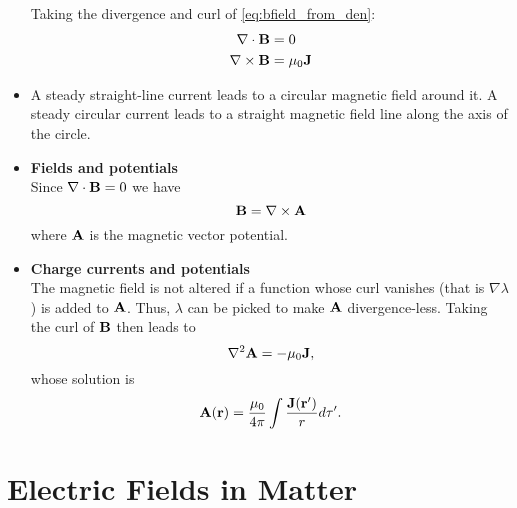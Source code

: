 \documentclass[11pt]{article}
\begin{document}
\begin{itemize}
Taking the divergence and curl of \cref{eq:bfield_from_den}:
\begin{align}
\nabla \cdot \mathbf{B} &= 0 \\
\nabla \times \mathbf{B} &= \mu_0 \mathbf{J} \label{eq:amperes_law}
\end{align}


\item A steady straight-line current leads to a circular magnetic field around it. A steady circular current leads to a straight magnetic field line along the axis of the circle.

\item \textbf{Fields and potentials} \\
Since $\nabla \cdot \mathbf{B} = 0$  we have 
\begin{equation} \mathbf{B} = \nabla \times \mathbf{A} \end{equation}
where $\mathbf{A}$ is the magnetic vector potential. 

\item \textbf{Charge currents and potentials} \\
The magnetic field is not altered if a function whose curl vanishes (that is $\nabla \lambda$ ) is added to $\mathbf{A}$. Thus, $\lambda$ can be picked to make $\mathbf{A}$ divergence-less. Taking the curl of $\mathbf{B}$ then leads to 
\begin{equation}
\nabla^2 \mathbf{A} = -\mu_0 \mathbf{J}, 
\end{equation}
whose solution is
\begin{equation}
    \mathbf{A}(\mathbf{r}) = \frac{\mu_0}{4 \pi } \int \frac{ \mathbf{J}(\mathbf{r}')}{r} d\tau'.
\end{equation}

\end{itemize}

\section{Electric Fields in Matter}
\end{document}
